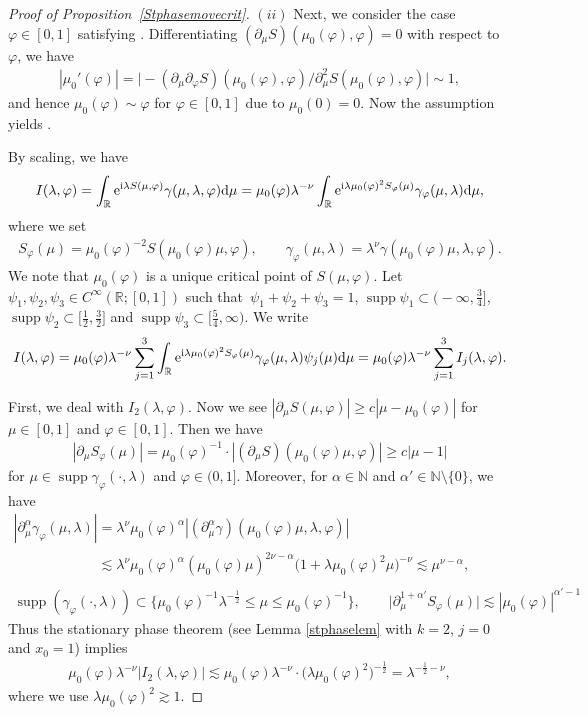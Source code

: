 \documentclass[10pt,a4paper]{amsart}
\numberwithin{equation}{section}
\def\R{\mathbb{R}}%
\DeclareMathOperator{\supp}{supp}%
\def\a{\alpha}
\def\c{\gamma}
\def\f{\varphi}
\def\g{\psi}
\def\l{\lambda}
\def\m{\mu}
\def\n{\nu}
\def\pa{\partial}
\begin{document}
\begin{proof}[Proof of Proposition~\ref{Stphasemovecrit}]
 $(ii)$ Next, we consider the case $\f\in [0,1]$ satisfying \smash{$\m_0(\f)\in \bigl[ 2^{-1}\l^{-\frac{1}{2}}, 1\bigr]$}.
Differentiating $(\pa_{\m}S)(\m_0(\f),\f)=0$ with respect to $\f$, we have
\begin{align*}
|\m_0'(\f)|=\bigl|-(\pa_{\m}\pa_{\f}S)(\m_0(\f),\f)/\pa_{\m}^2S(\m_0(\f),\f)\bigr|\sim 1,
\end{align*}
and hence $\m_0(\f)\sim \f$ for $\f\in [0,1]$ due to $\m_0(0)=0$. Now the assumption \smash{$\m_0(\f)\geq 2^{-1}\l^{-\frac{1}{2}}$} yields \smash{$\f\gtrsim \l^{-\frac{1}{2}}$}.

By scaling, we have
\begin{align*}
I(\l,\f)=\int_{\R}{\rm e}^{{\rm i}\l S(\m,\f)}\c(\m,\l,\f){\rm d}\m=\m_0(\f)\l^{-\n}\int_{\R}{\rm e}^{{\rm i}\l \m_0(\f)^2S_{\f}(\m)}\c_{\f}(\m,\l){\rm d}\m,
\end{align*}
where we set
\begin{align*}
S_{\f}(\m)=\m_0(\f)^{-2}S(\m_0(\f)\m,\f),\qquad \c_{\f}(\m,\l)=\l^{\n}\c(\m_0(\f)\m,\l,\f).
\end{align*}
We note that $\m_0(\f)$ is a unique critical point of $S(\m,\f)$.
Let $\g_1,\g_2,\g_3\in C^{\infty}(\R;[0,1])$ such that~${\g_1+\g_2+\g_3=1}$, $\supp \g_1\subset \bigl(-\infty,\frac{3}{4}\bigr]$, $\supp \g_2\subset \bigl[\frac{1}{2},\frac{3}{2}\bigr]$ and $\supp \g_3\subset \bigl[\frac{5}{4},\infty\bigr)$. We write
\begin{align*}
I(\l,\f)
=\m_0(\f)\l^{-\n}\sum_{j=1}^3\int_{\R}{\rm e}^{{\rm i}\l \m_0(\f)^2S_{\f}(\m)}\c_{\f}(\m,\l)\g_j(\m){\rm d}\m
=\m_0(\f)\l^{-\n}\sum_{j=1}^3I_j(\l,\f).
\end{align*}

First, we deal with $I_2(\l,\f)$.
Now we see $|\pa_{\m}S(\m,\f)|\geq c|\m-\m_0(\f)|$ for $\m\in [0,1]$ and $\f\in [0,1]$. Then we have
\begin{align*}
|\pa_{\m}S_{\f}(\m)|=\m_0(\f)^{-1}\cdot |(\pa_{\m}S)(\m_0(\f)\m,\f)|\geq c|\m-1|
\end{align*}
for $\m\in \supp \c_{\f}(\cdot,\l)$ and $\f\in (0,1]$.
Moreover, for $\a\in\mathbb{N}$ and $\a'\in \mathbb{N}\setminus\{0\}$, we have
\begin{gather*}
|\pa_{\m}^{\a}\c_{\f}(\m,\l)|=\l^{\n} \m_0(\f)^{\a}|(\pa_{\m}^{\a}\c)(\m_0(\f)\m,\l,\f)|\\
\phantom{|\pa_{\m}^{\a}\c_{\f}(\m,\l)|}{}\lesssim \l^{\n}\m_0(\f)^{\a} (\m_0(\f) \m)^{2\n-\a}\bigl(1+\l \m_0(\f)^2 \m\bigr)^{-\n}\lesssim \m^{\n-\a},\\
\supp (\c_{\f}(\cdot,\l))\subset \big\{\m_0(\f)^{-1}\l^{-\frac{1}{2}}\leq \m\leq \m_0(\f)^{-1}\big\},\qquad \big|\pa_{\m}^{1+\a'}S_{\f}(\m)\big|\lesssim |\m_0(\f)|^{\a'-1}
\end{gather*}
Thus the stationary phase theorem (see Lemma \ref{stphaselem} with $k=2$, $j=0$ and $x_0=1$) implies
\begin{align*}
\m_0(\f)\l^{-\n}|I_2(\l,\f)|
\lesssim \m_0(\f)\l^{-\n}\cdot \bigl(\l \m_0(\f)^2\bigr)^{-\frac{1}{2}}=\l^{-\frac{1}{2}-\n},
\end{align*}
where we use $\l \m_0(\f)^2\gtrsim 1$.


\end{proof}
\end{document}
